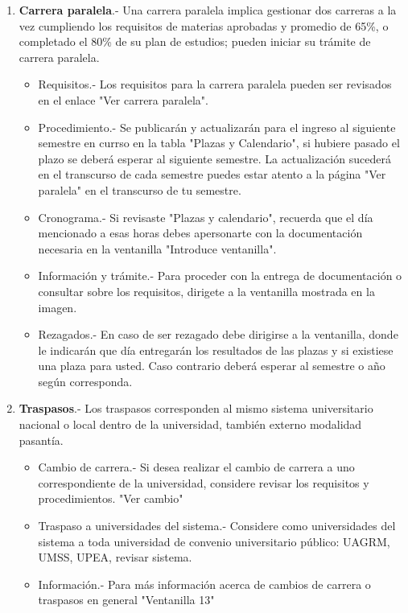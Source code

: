 \documentclass[letter, openright, 12pt]{book}
\begin{document}
\begin{enumerate}[label=(\alph*)]
\item \textbf{Carrera paralela}.- Una carrera paralela implica gestionar dos carreras a la vez cumpliendo los requisitos de materias aprobadas y promedio de 65\%, o completado el 80\% de su plan de estudios; pueden iniciar su trámite de carrera paralela. 
\begin{itemize}
\item Requisitos.- Los requisitos para la carrera paralela  pueden ser revisados en el enlace "Ver carrera paralela".
\item Procedimiento.- Se publicarán y actualizarán para el ingreso al  siguiente semestre en currso en la tabla "Plazas y Calendario", si hubiere pasado el plazo se deberá esperar al siguiente semestre. La actualización sucederá en el transcurso de cada semestre puedes estar atento a la página "Ver paralela" en el transcurso de tu semestre. 
\item Cronograma.- Si revisaste "Plazas y calendario", recuerda que el día mencionado a esas horas debes apersonarte con la documentación necesaria en la ventanilla "Introduce ventanilla".
\item Información y trámite.- Para proceder con la entrega de documentación o consultar sobre los requisitos, dirigete a la ventanilla mostrada en la imagen. 
\item Rezagados.- En caso de ser rezagado debe dirigirse a la ventanilla, donde le indicarán que día entregarán los resultados de las plazas y si existiese una plaza para usted. Caso contrario deberá esperar al semestre o año según corresponda.  
\end{itemize}

\item \textbf{Traspasos}.- Los traspasos corresponden al mismo sistema universitario nacional o local dentro de la universidad, también externo modalidad pasantía.
\begin{itemize}
\item Cambio de carrera.- Si desea realizar el cambio de carrera a uno correspondiente de la universidad, considere revisar los requisitos y procedimientos. "Ver cambio"
\item Traspaso a universidades del sistema.- Considere como universidades del sistema a toda universidad de convenio universitario público: UAGRM, UMSS, UPEA, revisar sistema. 
\item Información.- Para más información acerca de cambios de carrera o traspasos en general "Ventanilla 13"
\end{itemize}


\end{enumerate}
\end{document}
